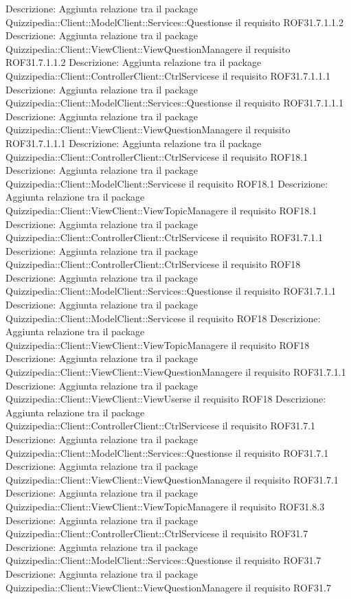Descrizione: Aggiunta relazione tra il package Quizzipedia::Client::ModelClient::Services::Questionse il requisito ROF31.7.1.1.2 
Descrizione: Aggiunta relazione tra il package Quizzipedia::Client::ViewClient::ViewQuestionManagere il requisito ROF31.7.1.1.2 
Descrizione: Aggiunta relazione tra il package Quizzipedia::Client::ControllerClient::CtrlServicese il requisito ROF31.7.1.1.1 
Descrizione: Aggiunta relazione tra il package Quizzipedia::Client::ModelClient::Services::Questionse il requisito ROF31.7.1.1.1 
Descrizione: Aggiunta relazione tra il package Quizzipedia::Client::ViewClient::ViewQuestionManagere il requisito ROF31.7.1.1.1 
Descrizione: Aggiunta relazione tra il package Quizzipedia::Client::ControllerClient::CtrlServicese il requisito ROF18.1 
Descrizione: Aggiunta relazione tra il package Quizzipedia::Client::ModelClient::Servicese il requisito ROF18.1 
Descrizione: Aggiunta relazione tra il package Quizzipedia::Client::ViewClient::ViewTopicManagere il requisito ROF18.1 
Descrizione: Aggiunta relazione tra il package Quizzipedia::Client::ControllerClient::CtrlServicese il requisito ROF31.7.1.1 
Descrizione: Aggiunta relazione tra il package Quizzipedia::Client::ControllerClient::CtrlServicese il requisito ROF18 
Descrizione: Aggiunta relazione tra il package Quizzipedia::Client::ModelClient::Services::Questionse il requisito ROF31.7.1.1 
Descrizione: Aggiunta relazione tra il package Quizzipedia::Client::ModelClient::Servicese il requisito ROF18 
Descrizione: Aggiunta relazione tra il package Quizzipedia::Client::ViewClient::ViewTopicManagere il requisito ROF18 
Descrizione: Aggiunta relazione tra il package Quizzipedia::Client::ViewClient::ViewQuestionManagere il requisito ROF31.7.1.1 
Descrizione: Aggiunta relazione tra il package Quizzipedia::Client::ViewClient::ViewUserse il requisito ROF18 
Descrizione: Aggiunta relazione tra il package Quizzipedia::Client::ControllerClient::CtrlServicese il requisito ROF31.7.1 
Descrizione: Aggiunta relazione tra il package Quizzipedia::Client::ModelClient::Services::Questionse il requisito ROF31.7.1 
Descrizione: Aggiunta relazione tra il package Quizzipedia::Client::ViewClient::ViewQuestionManagere il requisito ROF31.7.1 
Descrizione: Aggiunta relazione tra il package Quizzipedia::Client::ViewClient::ViewTopicManagere il requisito ROF31.8.3 
Descrizione: Aggiunta relazione tra il package Quizzipedia::Client::ControllerClient::CtrlServicese il requisito ROF31.7 
Descrizione: Aggiunta relazione tra il package Quizzipedia::Client::ModelClient::Services::Questionse il requisito ROF31.7 
Descrizione: Aggiunta relazione tra il package Quizzipedia::Client::ViewClient::ViewQuestionManagere il requisito ROF31.7 
